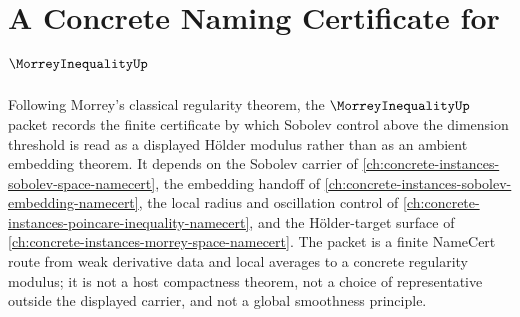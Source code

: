 \chapter{A Concrete Naming Certificate for $\MorreyInequalityUp$}
\label{ch:concrete-instances-morrey-inequality-namecert}

Following Morrey's classical regularity theorem, the $\MorreyInequalityUp$ packet records the finite certificate by which Sobolev control above the dimension threshold is read as a displayed Hölder modulus rather than as an ambient embedding theorem. It depends on the Sobolev carrier of \autoref{ch:concrete-instances-sobolev-space-namecert}, the embedding handoff of \autoref{ch:concrete-instances-sobolev-embedding-namecert}, the local radius and oscillation control of \autoref{ch:concrete-instances-poincare-inequality-namecert}, and the Hölder-target surface of \autoref{ch:concrete-instances-morrey-space-namecert}. The packet is a finite NameCert route from weak derivative data and local averages to a concrete regularity modulus; it is not a host compactness theorem, not a choice of representative outside the displayed carrier, and not a global smoothness principle.

